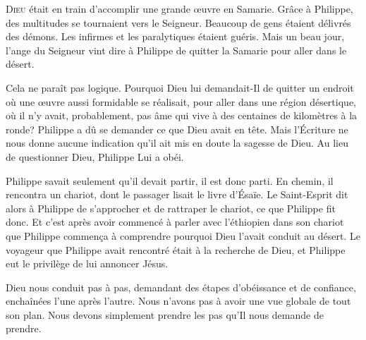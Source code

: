 \dvrule







\lettrine{D}{ieu} était en train d'accomplir une grande \oe{}uvre en Samarie.
 Grâce à Philippe, des multitudes se tournaient vers le Seigneur.
 Beaucoup de gens étaient délivrés des démons.
 Les infirmes et les paralytiques étaient guéris. Mais un beau jour,
 l'ange du Seigneur vint dire à Philippe de quitter la Samarie
 pour aller dans le désert.

Cela ne paraît pas logique. Pourquoi Dieu lui demandait-Il de quitter
 un endroit où une \oe{}uvre aussi formidable se réalisait,
 pour aller dans une région désertique, où il n'y avait, probablement,
 pas âme qui vive à des centaines de kilomètres à la ronde?
 Philippe a dû se demander ce que Dieu avait en tête.
 Mais l'Écriture ne nous donne aucune indication
 qu'il ait mis en doute la sagesse de Dieu.
 Au lieu de questionner Dieu, Philippe Lui a obéi.


Philippe savait seulement qu'il devait partir, il est donc parti.
 En chemin, il rencontra un chariot, dont le passager lisait le livre d'Ésaïe.
 Le Saint-Esprit dit alors à Philippe de s'approcher et de rattraper le chariot,
 ce que Philippe fit donc. Et c'est après avoir commencé à parler
 avec l'éthiopien dans son chariot que Philippe commen\c{c}a à comprendre
 pourquoi Dieu l'avait conduit au désert.
 Le voyageur que Philippe avait rencontré était à la recherche de Dieu,
 et Philippe eut le privilège de lui annoncer Jésus.

Dieu nous conduit pas à pas, demandant des étapes d'obéissance et de confiance,
 enchaînées l'une après l'autre. Nous n'avons pas à avoir une vue globale
 de tout son plan. Nous devons simplement prendre les pas
 qu'Il nous demande de prendre.

